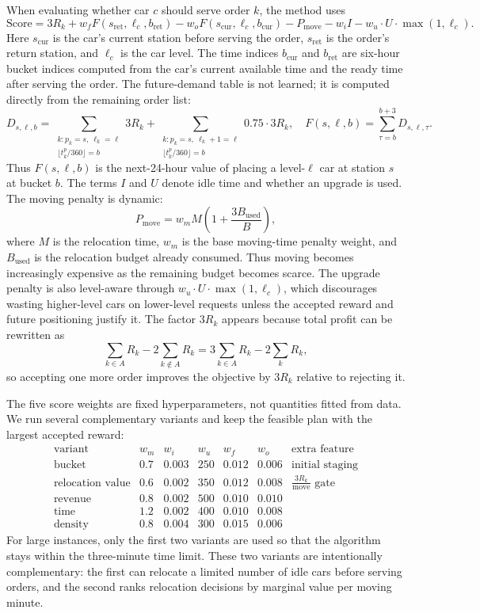 \documentclass[10pt,a4paper]{article}
\begin{document}
When evaluating whether car $c$ should serve order $k$, the method uses
\[
\text{Score}
=3R_k
+ w_f F(s_{\text{ret}}, \ell_c, b_{\text{ret}})
- w_o F(s_{\text{cur}}, \ell_c, b_{\text{cur}})
- P_{\text{move}}
- w_i I
- w_u \cdot U \cdot \max(1,\ell_c).
\]
Here $s_{\text{cur}}$ is the car's current station before serving the order,
$s_{\text{ret}}$ is the order's return station, and $\ell_c$ is the car level.
The time indices $b_{\text{cur}}$ and $b_{\text{ret}}$ are six-hour bucket
indices computed from the car's current available time and the ready time after
serving the order.  The future-demand table is not learned; it is computed
directly from the remaining order list:
\[
D_{s,\ell,b}=\sum_{\substack{k:p_k=s,\ \ell_k=\ell\\
\lfloor t^p_k/360\rfloor=b}}3R_k
+\sum_{\substack{k:p_k=s,\ \ell_k+1=\ell\\
\lfloor t^p_k/360\rfloor=b}}0.75\cdot 3R_k,
\quad
F(s,\ell,b)=\sum_{\tau=b}^{b+3}D_{s,\ell,\tau}.
\]
Thus $F(s,\ell,b)$ is the next-24-hour value of placing a level-$\ell$ car at
station $s$ at bucket $b$.  The terms $I$ and $U$ denote idle time and whether
an upgrade is used.
The moving penalty is dynamic:
\[
P_{\text{move}}=w_m M\left(1+\frac{3B_{\text{used}}}{B}\right),
\]
where $M$ is the relocation time, $w_m$ is the base moving-time penalty weight,
and $B_{\text{used}}$ is the relocation budget already consumed.  Thus moving
becomes increasingly expensive as the remaining budget becomes scarce.  The
upgrade penalty is also level-aware through
$w_u\cdot U\cdot\max(1,\ell_c)$, which discourages wasting higher-level cars on
lower-level requests unless the accepted reward and future positioning justify
it.  The factor $3R_k$ appears because total profit can be rewritten as
\[
\sum_{k\in A} R_k-2\sum_{k\notin A}R_k
=3\sum_{k\in A}R_k-2\sum_k R_k,
\]
so accepting one more order improves the objective by $3R_k$ relative to
rejecting it.

The five score weights are fixed hyperparameters, not quantities fitted from
data.  We run several complementary variants and keep the feasible plan with the
largest accepted reward:
\[
\begin{array}{c|ccccc|l}
\text{variant} & w_m & w_i & w_u & w_f & w_o & \text{extra feature}\\
\hline
\text{bucket} & 0.7 & 0.003 & 250 & 0.012 & 0.006 & \text{initial staging}\\
\text{relocation value} & 0.6 & 0.002 & 350 & 0.012 & 0.008
& \frac{3R_k}{\text{move}}\text{ gate}\\
\text{revenue} & 0.8 & 0.002 & 500 & 0.010 & 0.010\\
\text{time} & 1.2 & 0.002 & 400 & 0.010 & 0.008\\
\text{density} & 0.8 & 0.004 & 300 & 0.015 & 0.006
\end{array}
\]
For large instances, only the first two variants are used so that the algorithm
stays within the three-minute time limit.  These two variants are intentionally
complementary: the first can relocate a limited number of idle cars before
serving orders, and the second ranks relocation decisions by marginal value per
moving minute.
\end{document}
